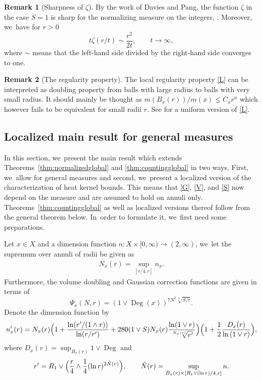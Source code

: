 \documentclass[JEP,XML,SOM,Unicode,published]{cedram}
\theoremstyle{plain}
\theoremstyle{definition}
\newtheorem*{remark}{Remark}
\DeclareMathOperator{\Deg}{Deg}
\begin{document}
\begin{remark}[{Sharpness of $ \zeta $}]By the work of Davies and Pang, the function $\zeta$ in the case $S=1$ is sharp for the normalizing measure on the integers,
\cite{Davies-93, Pang-93}. Moreover, we~have for $r>0$
\[
t\zeta(r/t)\sim \frac{r^2}{2t},\qquad t\to \infty,
\]
where {$\sim$}
means that the left-hand side divided by the right-hand side converges to one.
\end{remark}

\begin{remark}[{The regularity property}] The local regularity property \eqref{L} can be interpreted as doubling property from balls with large radius to balls with very small radius. It should mainly be thought as $ m(B_{x}(r))/m(x)\leq C_x r^{n} $ which however fails to be equivalent for small radii $ r $. See \cite{BarlowChen-16} for a uniform version of \eqref{L}.
\end{remark}

\subsection{Localized main result for general measures}\label{section:mainresults}

{
In this section, we~present the main result which extends Theorems~\ref{thm:normalizedglobal} and \ref{thm:countingglobal} in two ways. First, we~allow for general measures and second, we~present a localized version of the characterization of heat kernel bounds. This means that \eqref{G}, \eqref{V}, and \eqref{S} now depend on the measure and are assumed to hold on annuli only.
Theorems~\ref{thm:countingglobal} as well as localized versions thereof follow from the general theorem below. In~order to formulate it, we~first need some preparations.
}

{Let $x\in X$ and}
a dimension function {$n\colon X\times [0,\infty)\to (2,\infty)$}, we~let the supremum over annuli {of radii} be given as
\begin{align*}
N_x(r)=\sup_{[r/4,r]} n_x.
\end{align*}
Furthermore, the volume doubling and {Gaussian} correction functions are given in terms of
\[
\Psi_x(N,r)=\left(1\vee\Deg(x)
\right)^{7N^2\sqrt[N]{S/r}}.
\]
Denote
the dimension function by
\[
n_x'(r)=
N_x(r) \Bigl(1+\frac{\ln(r'/(1\wedge r))}{\ln(r/r')} +{28
0 (1\vee S) N_x(r){\frac{\ln (1\vee r)}{\sqrt[ N_x(r)]{r'}}}}\Bigr)\Bigl(1+ \frac{1}{2}\frac{D_x(r)} {\ln \left(1\vee r\right)}\Bigr),
\]
where $D_x(r)=\sup_{B_x(r)}1\vee \Deg$ and
\[
r'= R_1\vee\Bigl( \frac{r}{4}\wedge \frac{1}{4}(\ln r)^{2\tilde N(r)}\Bigr),\qquad \tilde N(r)=\sup_{B_{x}(r)\times [R_1\vee (\ln r)/4,r]}n.
\]
\end{document}
